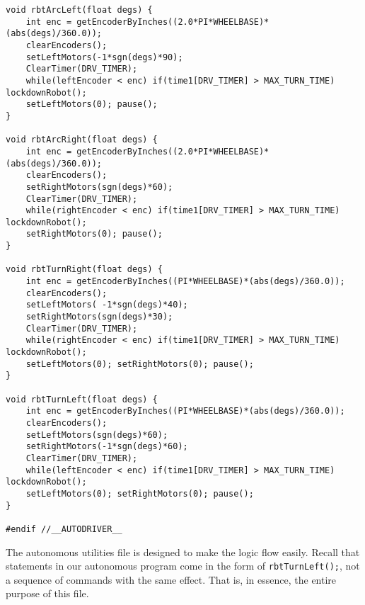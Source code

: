 \begin{lstlisting}
void rbtArcLeft(float degs) {
	int enc = getEncoderByInches((2.0*PI*WHEELBASE)*(abs(degs)/360.0));
	clearEncoders();
	setLeftMotors(-1*sgn(degs)*90);
	ClearTimer(DRV_TIMER);
	while(leftEncoder < enc) if(time1[DRV_TIMER] > MAX_TURN_TIME) lockdownRobot();
	setLeftMotors(0); pause();
}

void rbtArcRight(float degs) {
	int enc = getEncoderByInches((2.0*PI*WHEELBASE)*(abs(degs)/360.0));
	clearEncoders();
	setRightMotors(sgn(degs)*60);
	ClearTimer(DRV_TIMER);
	while(rightEncoder < enc) if(time1[DRV_TIMER] > MAX_TURN_TIME) lockdownRobot();
	setRightMotors(0); pause();
}

void rbtTurnRight(float degs) {
	int enc = getEncoderByInches((PI*WHEELBASE)*(abs(degs)/360.0));
	clearEncoders();
	setLeftMotors( -1*sgn(degs)*40);
	setRightMotors(sgn(degs)*30);
	ClearTimer(DRV_TIMER);
	while(rightEncoder < enc) if(time1[DRV_TIMER] > MAX_TURN_TIME) lockdownRobot();
	setLeftMotors(0); setRightMotors(0); pause();
}

void rbtTurnLeft(float degs) {
	int enc = getEncoderByInches((PI*WHEELBASE)*(abs(degs)/360.0));
	clearEncoders();
	setLeftMotors(sgn(degs)*60);
	setRightMotors(-1*sgn(degs)*60);
	ClearTimer(DRV_TIMER);
	while(leftEncoder < enc) if(time1[DRV_TIMER] > MAX_TURN_TIME) lockdownRobot();
	setLeftMotors(0); setRightMotors(0); pause();
}

#endif //__AUTODRIVER__
\end{lstlisting}

The autonomous utilities file is designed to make the logic flow easily. Recall that statements in our autonomous program come in the form of \lstinline{rbtTurnLeft();}, not a sequence of commands with the same effect. That is, in essence, the entire purpose of this file.

\begin{comment}
	\subsubsection{Drive differential binary search algorithm}
	This algorithm is designed to determine the power differential between both sides of the robot. Due to the mechanical properties of motors and chains, the power required to move a certain speed is slightly different for each side of the robot. This program is designed to accurately determine what that differential is, and allow us to accommodate for it in code.

	\begin{lstlisting}
	#include "drivers/autoutils.h"

	task main() {
		float low = 0;
		float high = 2;
		float mid = 1;
		while(true) {
			mid = (low + high) / 2.0;
			nxtDisplayTextLine(3, "%f", high);
			nxtDisplayTextLine(4, "%f", mid);
			nxtDisplayTextLine(5, "%f", low);

			clearEncoders();
			setLeftMotors(50.0*mid);
			setRightMotors(50);
			wait1Msec(3000);
			setLeftMotors(0); setRightMotors(0);

			bool cont = false;
			while(!cont) {
				if(nNxtButtonPressed == BTN_RIGHT) {high = mid; cont = true;}
				if(nNxtButtonPressed == BTN_LEFT) {low = mid; cont = true;}
			}
		}
	}
	\end{lstlisting}
\end{comment}